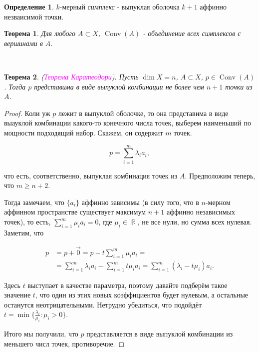 \documentclass[a4paper,100pt]{article}
\theoremstyle{indented}
\newtheorem{theorem}{Теорема}
\theoremstyle{definition}
\newtheorem{defn}{Определение}
\theoremstyle{remark}
\DeclareMathOperator{\Conv}{Conv}
\DeclareMathOperator{\RR}{\mathbb{R}}
\begin{document}
\begin{defn}
    $k$-мерный \textit{симплекс} - выпуклая оболочка $k+1$ аффинно незваисимой точки.
\end{defn} 

\begin{theorem}
    Для любого $A \subset X$, $\Conv(A)$ - объединение всех симплексов с вершинами в $A$.
\end{theorem} \

\begin{theorem}
    (\textit{\textcolor{magenta}{\hypertarget{s92}{Теорема Каратеодори}}}). Пусть $\dim X = n$, $A\subset X$, $p\in \Conv (A)$. Тогда $p$ представима в виде выпуклой комбинации не более чем $n+1$ точки из $A$. 
\end{theorem}

\begin{proof}
    Коли уж $p$ лежит в выпуклой оболочке, то она представима в виде выауклой комбинации какого-то конечного числа точек, выберем наименьший по мощности подходящий набор. Скажем, он содержит $m$ точек.

    \[
        p = \sum_{i=1}^m \lambda_i a_i,
    \]

    что есть, соответственно, выпуклая комбинация точек из $A$. Предположим теперь, что $m\geq n+2$. \
    
    Тогда замечаем, что $\{a_i\}$ аффинно зависимы (в силу того, что в $n$-мерном аффинном пространстве существует максимум $n+1$ аффинно независимых точек), то есть, $\sum_{i=1}^m \mu_i a_i = 0$, где $\mu_i \in \RR$, не все нули, но сумма всех нулевая. Заметим, что 

    \begin{equation*}
        \begin{aligned}
            p & = p + \vec{0} = p - t\sum_{i=1}^m \mu_i a_i = \\
            & = \sum_{i=1}^m \lambda_i a_i - \sum_{i=1}^m t \mu_i a_i = \sum_{i=1}^m (\lambda_i - t \mu_i) a_i.
        \end{aligned}    
    \end{equation*}

    Здесь $t$ выступает в качестве параметра, поэтому давайте подберём такое значение $t$, что один из этих новых коэффициентов будет нулевым, а остальные останутся неотрицательными. Нетрудно убедиться, что подойдёт $t = \min\{\frac{\lambda_i}{\mu_i}: \mu_i > 0\}$. \

    Итого мы получили, что $p$ представляется в виде выпуклой комбинации из меньшего числ точек, противоречие.
\end{proof}  
\end{document}
